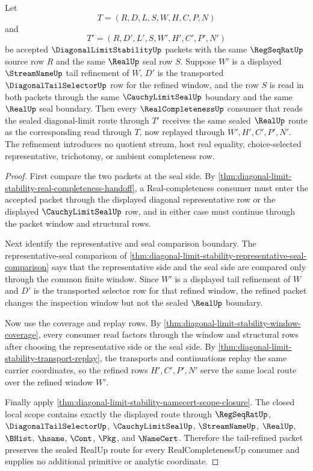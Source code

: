\begin{theorem}
\label{thm:diagonal-limit-stability-tail-refinement-invariance}
Let
$$
T=(R,D,L,S,W,H,C,P,N)
$$
and
$$
T'=(R,D',L',S,W',H',C',P',N')
$$
be accepted $\DiagonalLimitStabilityUp$ packets with the same $\RegSeqRatUp$ source row $R$ and the same $\RealUp$ seal row $S$. Suppose $W'$ is a displayed $\StreamNameUp$ tail refinement of $W$, $D'$ is the transported $\DiagonalTailSelectorUp$ row for the refined window, and the row $S$ is read in both packets through the same $\CauchyLimitSealUp$ boundary and the same $\RealUp$ seal boundary. Then every $\RealCompletenessUp$ consumer that reads the sealed diagonal-limit route through $T'$ receives the same sealed $\RealUp$ route as the corresponding read through $T$, now replayed through $W',H',C',P',N'$. The refinement introduces no quotient stream, host real equality, choice-selected representative, trichotomy, or ambient completeness row.
\end{theorem}
\begin{proof}
First compare the two packets at the seal side. By \autoref{thm:diagonal-limit-stability-real-completeness-handoff}, a Real-completeness consumer must enter the accepted packet through the displayed diagonal representative row or the displayed $\CauchyLimitSealUp$ row, and in either case must continue through the packet window and structural rows.

Next identify the representative and seal comparison boundary. The representative-seal comparison of \autoref{thm:diagonal-limit-stability-representative-seal-comparison} says that the representative side and the seal side are compared only through the common finite window. Since $W'$ is a displayed tail refinement of $W$ and $D'$ is the transported selector row for that refined window, the refined packet changes the inspection window but not the sealed $\RealUp$ boundary.

Now use the coverage and replay rows. By \autoref{thm:diagonal-limit-stability-window-coverage}, every consumer read factors through the window and structural rows after choosing the representative side or the seal side. By \autoref{thm:diagonal-limit-stability-transport-replay}, the transports and continuations replay the same carrier coordinates, so the refined rows $H',C',P',N'$ serve the same local route over the refined window $W'$.

Finally apply \autoref{thm:diagonal-limit-stability-namecert-scope-closure}. The closed local scope contains exactly the displayed route through $\RegSeqRatUp$, $\DiagonalTailSelectorUp$, $\CauchyLimitSealUp$, $\StreamNameUp$, $\RealUp$, $\BHist$, $\hsame$, $\Cont$, $\Pkg$, and $\NameCert$. Therefore the tail-refined packet preserves the sealed RealUp route for every RealCompletenessUp consumer and supplies no additional primitive or analytic coordinate.
\end{proof}


